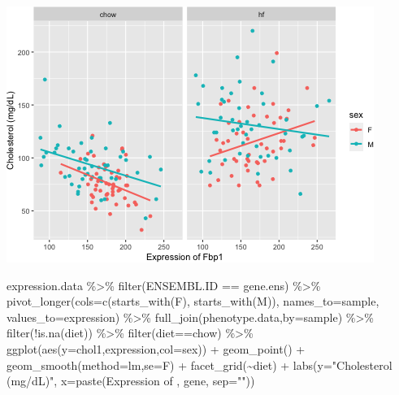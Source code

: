 \documentclass[
]{article}
\newenvironment{Shaded}{\begin{snugshade}}{\end{snugshade}}
\newcommand{\AttributeTok}[1]{\textcolor[rgb]{0.77,0.63,0.00}{#1}}
\newcommand{\FunctionTok}[1]{\textcolor[rgb]{0.00,0.00,0.00}{#1}}
\newcommand{\NormalTok}[1]{#1}
\newcommand{\SpecialCharTok}[1]{\textcolor[rgb]{0.00,0.00,0.00}{#1}}
\newcommand{\StringTok}[1]{\textcolor[rgb]{0.31,0.60,0.02}{#1}}
\begin{document}
\includegraphics{figures/Fbp1-associations-1.png}

\begin{Shaded}
\begin{Highlighting}[]
\NormalTok{expression.data }\SpecialCharTok{\%\textgreater{}\%}
  \FunctionTok{filter}\NormalTok{(ENSEMBL.ID }\SpecialCharTok{==}\NormalTok{ gene.ens) }\SpecialCharTok{\%\textgreater{}\%}
  \FunctionTok{pivot\_longer}\NormalTok{(}\AttributeTok{cols=}\FunctionTok{c}\NormalTok{(}\FunctionTok{starts\_with}\NormalTok{(}\StringTok{\textquotesingle{}F\textquotesingle{}}\NormalTok{),}
                      \FunctionTok{starts\_with}\NormalTok{(}\StringTok{\textquotesingle{}M\textquotesingle{}}\NormalTok{)),}
               \AttributeTok{names\_to=}\StringTok{\textquotesingle{}sample\textquotesingle{}}\NormalTok{,}
               \AttributeTok{values\_to=}\StringTok{\textquotesingle{}expression\textquotesingle{}}\NormalTok{) }\SpecialCharTok{\%\textgreater{}\%}
  \FunctionTok{full\_join}\NormalTok{(phenotype.data,}\AttributeTok{by=}\StringTok{\textquotesingle{}sample\textquotesingle{}}\NormalTok{) }\SpecialCharTok{\%\textgreater{}\%}
  \FunctionTok{filter}\NormalTok{(}\SpecialCharTok{!}\FunctionTok{is.na}\NormalTok{(diet)) }\SpecialCharTok{\%\textgreater{}\%}
  \FunctionTok{filter}\NormalTok{(diet}\SpecialCharTok{==}\StringTok{\textquotesingle{}chow\textquotesingle{}}\NormalTok{) }\SpecialCharTok{\%\textgreater{}\%}
  \FunctionTok{ggplot}\NormalTok{(}\FunctionTok{aes}\NormalTok{(}\AttributeTok{y=}\NormalTok{chol1,expression,}\AttributeTok{col=}\NormalTok{sex)) }\SpecialCharTok{+}
  \FunctionTok{geom\_point}\NormalTok{() }\SpecialCharTok{+}
  \FunctionTok{geom\_smooth}\NormalTok{(}\AttributeTok{method=}\StringTok{\textquotesingle{}lm\textquotesingle{}}\NormalTok{,}\AttributeTok{se=}\NormalTok{F) }\SpecialCharTok{+}
  \FunctionTok{facet\_grid}\NormalTok{(}\SpecialCharTok{\textasciitilde{}}\NormalTok{diet) }\SpecialCharTok{+}
  \FunctionTok{labs}\NormalTok{(}\AttributeTok{y=}\StringTok{"Cholesterol (mg/dL)"}\NormalTok{,}
       \AttributeTok{x=}\FunctionTok{paste}\NormalTok{(}\StringTok{\textquotesingle{}Expression of \textquotesingle{}}\NormalTok{, gene, }\AttributeTok{sep=}\StringTok{""}\NormalTok{))}
\end{Highlighting}
\end{Shaded}
\end{document}
